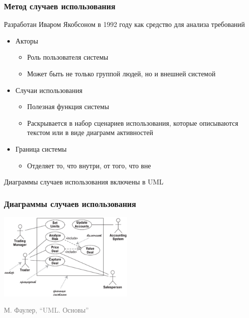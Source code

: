 \documentclass[xetex,mathserif,serif]{beamer}
\newcommand{\attribution}[1] {
	\begin{flushright}\begin{scriptsize}\textcolor{gray}{\textcopyright\; #1}\end{scriptsize}\end{flushright}
}
\begin{document}
	\begin{frame}
		\frametitle{Метод случаев использования}
		Разработан Иваром Якобсоном в 1992 году как средство для анализа требований
		\begin{itemize}
			\item Акторы
			\begin{itemize}
				\item Роль пользователя системы
				\item Может быть не только группой людей, но и внешней системой
			\end{itemize}
			\item Случаи использования
			\begin{itemize}
				\item Полезная функция системы
				\item Раскрывается в набор сценариев использования, которые описываются текстом или в виде диаграмм активностей
			\end{itemize}
			\item Граница системы
			\begin{itemize}
				\item Отделяет то, что внутри, от того, что вне
			\end{itemize}
		\end{itemize}
		Диаграммы случаев использования включены в UML
	\end{frame}

	\begin{frame}
		\frametitle{Диаграммы случаев использования}
		\begin{center}
			\includegraphics[width=0.5\textwidth]{useCaseDiagram.png}
		\end{center}
		\attribution{М. Фаулер, ``UML. Основы''}
	\end{frame}
\end{document}
